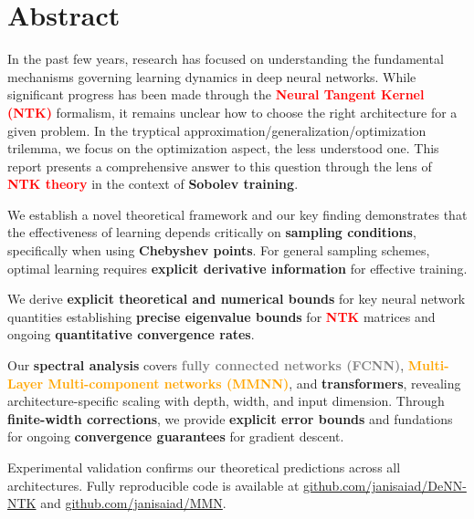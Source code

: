 \documentclass[a4paper]{article}
\theoremstyle{plain}
\theoremstyle{definition}
\theoremstyle{remark}
\begin{document}
	\newpage
	\tableofcontents
\newpage






\section*{Abstract}

In the past few years, research has focused on understanding the fundamental mechanisms governing learning dynamics in deep neural networks. While significant progress has been made through the \textcolor{red}{\textbf{Neural Tangent Kernel (NTK)}} formalism, it remains unclear how
to choose the right architecture for a given problem. In the tryptical approximation/generalization/optimization trilemma, we focus on the optimization aspect, the less understood one.
This report presents a comprehensive answer to this question through the lens of \textcolor{red}{\textbf{NTK theory}} in the context of
\textbf{Sobolev training}.

We establish a novel theoretical framework and our key finding demonstrates that the effectiveness of learning depends critically on \textbf{sampling conditions}, specifically when using \textbf{Chebyshev points}.
For general sampling schemes, optimal learning requires \textbf{explicit derivative information} for effective training.

We derive \textbf{explicit theoretical and numerical bounds} for key neural network quantities establishing \textbf{precise eigenvalue bounds} for \textcolor{red}{\textbf{NTK}} matrices and ongoing \textbf{quantitative convergence rates}.

Our \textbf{spectral analysis} covers \textcolor{gray}{\textbf{fully connected networks (FCNN)}}, \textcolor{orange}{\textbf{Multi-Layer Multi-component networks (MMNN)}}, and \textbf{transformers}, revealing architecture-specific scaling with depth, width, and input dimension. 
Through \textbf{finite-width corrections}, we provide \textbf{explicit error bounds} and fundations for ongoing \textbf{convergence guarantees} for gradient descent.

Experimental validation confirms our theoretical predictions across all architectures. Fully reproducible code is available at \href{https://github.com/janisaiad/DeNN-NTK}{github.com/janisaiad/DeNN-NTK} and \href{https://github.com/janisaiad/MMN}{github.com/janisaiad/MMN}.

\vspace{0.5cm}
\end{document}
